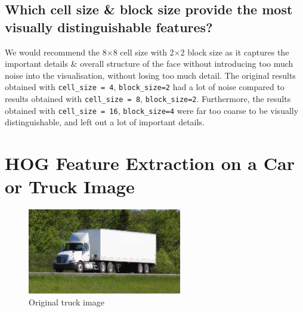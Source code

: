 \documentclass[a4paper]{article}
\begin{document}
\subsection{Which cell size \& block size provide the most visually distinguishable features?}
We would recommend the 8$\times$8 cell size with 2$\times$2 block size as it captures the important details \& overall structure of the face without introducing too much noise into the visualisation, without losing too much detail.
The original results obtained with \texttt{cell_size = 4}, \texttt{block_size=2} had a lot of noise compared to results obtained with \texttt{cell_size = 8}, \texttt{block_size=2}.
Furthermore, the results obtained with \texttt{cell_size = 16}, \texttt{block_size=4} were far too coarse to be visually distinguishable, and left out a lot of important details.

\section{HOG Feature Extraction on a Car or Truck Image}
\begin{figure}[H]
    \centering
    \includegraphics[width=0.6\textwidth]{../code/truck.jpg}
    \caption{Original truck image}
\end{figure}
\end{document}
